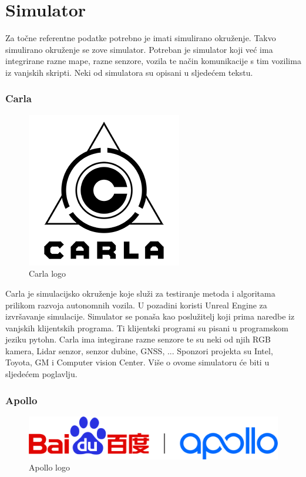 \section{Simulator}

Za točne referentne podatke potrebno je imati simulirano okruženje. Takvo simulirano okruženje se zove simulator. Potreban je simulator koji već ima integrirane razne mape, razne senzore, vozila te način komunikacije s tim vozilima iz vanjskih skripti. Neki od simulatora su opisani u sljedećem tekstu.

\subsubsection{Carla}
\begin{figure}[ht!]
  \centering
  \includegraphics[scale=0.5]{images/carla_logo.png}
  \caption{Carla logo\cite{logo:carla}}
\end{figure}

Carla\cite{dosovitskiy17} je simulacijsko okruženje koje služi za testiranje metoda i algoritama prilikom razvoja autonomnih vozila. U pozadini koristi Unreal Engine za izvršavanje simulacije. Simulator se ponaša kao poslužitelj koji prima naredbe iz vanjskih klijentskih programa. Ti klijentski programi su pisani u programskom jeziku pytohn.
Carla ima integirane razne senzore te su neki od njih RGB kamera, Lidar senzor, senzor dubine, GNSS, ... Sponzori projekta su Intel, Toyota, GM i Computer vision Center. Više o ovome simulatoru će biti u sljedećem poglavlju.
\pagebreak
\subsubsection{Apollo}
\begin{figure}[ht!]
  \centering
  \includegraphics[scale=0.2]{images/apollo_logo.png}
  \caption{Apollo logo\cite{logo:apollo}}
\end{figure}

